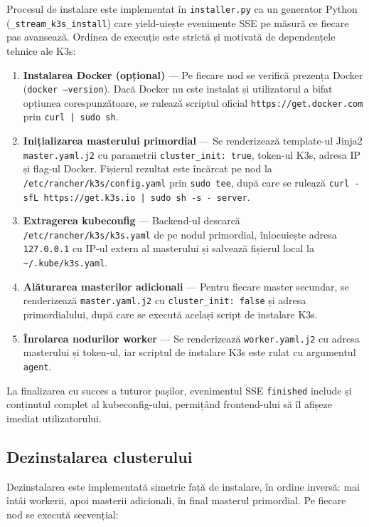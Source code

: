 \documentclass[12pt,a4paper]{report}
\begin{document}
Procesul de instalare este implementat în \texttt{installer.py} ca un generator Python (\texttt{\_stream\_k3s\_install}) care yield-uiește evenimente SSE pe măsură ce fiecare pas avansează. Ordinea de execuție este strictă și motivată de dependențele tehnice ale K3s:

\begin{enumerate}
  \item \textbf{Instalarea Docker (opțional)} — Pe fiecare nod se verifică prezența Docker (\texttt{docker --version}). Dacă Docker nu este instalat și utilizatorul a bifat opțiunea corespunzătoare, se rulează scriptul oficial \texttt{https://get.docker.com} prin \texttt{curl | sudo sh}.
  \item \textbf{Inițializarea masterului primordial} — Se renderizează template-ul Jinja2 \texttt{master.yaml.j2} cu parametrii \texttt{cluster\_init: true}, token-ul K3s, adresa IP și flag-ul Docker. Fișierul rezultat este încărcat pe nod la \texttt{/etc/rancher/k3s/config.yaml} prin \texttt{sudo tee}, după care se rulează \texttt{curl -sfL https://get.k3s.io | sudo sh -s - server}.
  \item \textbf{Extragerea kubeconfig} — Backend-ul descarcă \texttt{/etc/rancher/k3s/k3s.yaml} de pe nodul primordial, înlocuiește adresa \texttt{127.0.0.1} cu IP-ul extern al masterului și salvează fișierul local la \texttt{\textasciitilde/.kube/k3s.yaml}.
  \item \textbf{Alăturarea masterilor adicionali} — Pentru fiecare master secundar, se renderizează \texttt{master.yaml.j2} cu \texttt{cluster\_init: false} și adresa primordialului, după care se execută același script de instalare K3s.
  \item \textbf{Înrolarea nodurilor worker} — Se renderizează \texttt{worker.yaml.j2} cu adresa masterului și token-ul, iar scriptul de instalare K3s este rulat cu argumentul \texttt{agent}.
\end{enumerate}

La finalizarea cu succes a tuturor pașilor, evenimentul SSE \texttt{finished} include și conținutul complet al kubeconfig-ului, permițând frontend-ului să îl afișeze imediat utilizatorului.

\subsection{Dezinstalarea clusterului}

Dezinstalarea este implementată simetric față de instalare, în ordine inversă: mai întâi workerii, apoi masterii adicionali, în final masterul primordial. Pe fiecare nod se execută secvențial:
\end{document}
